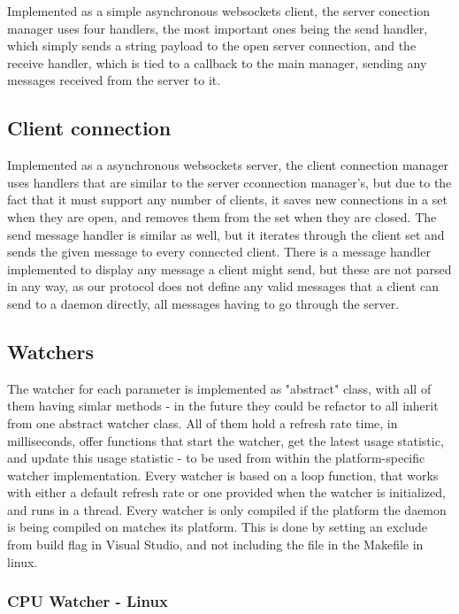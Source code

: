 \documentclass{l3proj}
\begin{document}
Implemented as a simple asynchronous websockets client, the server conection manager uses four handlers, the most important ones being the send handler, which simply sends a string payload to the open server connection, and the receive handler, which is tied to a callback to the main manager, sending any messages received from the server to it.

\subsection{Client connection}

Implemented as a asynchronous websockets server, the client connection manager uses handlers that are similar to the server cconnection manager's, but due to the fact that it must support any number of clients, it saves new connections in a set when they are open, and removes them from the set when they are closed. The send message handler is similar as well, but it iterates through the client set and sends the given message to every connected client. There is a message handler implemented to display any message a client might send, but these are not parsed in any way, as our protocol does not define any valid messages that a client can send to a daemon directly, all messages having to go through the server.

\subsection{Watchers}

The watcher for each parameter is implemented as "abstract" class, with all of them having simlar methods - in the future they could be refactor to all inherit from one abstract watcher class. All of them hold a refresh rate time, in milliseconds, offer functions that start the watcher, get the latest usage statistic, and update this usage statistic - to be used from within the platform-specific watcher implementation. Every watcher is based on a loop function, that works with either a default refresh rate or one provided when the watcher is initialized, and runs in a thread.
Every watcher is only compiled if the platform the daemon is being compiled on matches its platform. This is done by setting an exclude from build flag in Visual Studio, and not including the file in the Makefile in linux.

\subsubsection{CPU Watcher - Linux}
\end{document}
